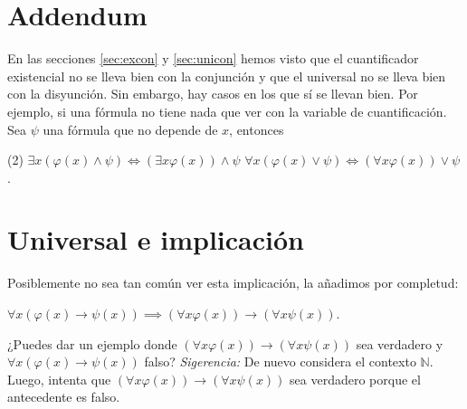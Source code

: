 \documentclass[letterpaper,DIV=12,headsepline,12pt]{scrartcl}
\begin{document}
\section{Addendum}
En las secciones \ref{sec:excon} y \ref{sec:unicon} hemos visto que el
cuantificador existencial no se lleva bien con la conjunción y que el universal
no se lleva bien con la disyunción. Sin embargo, hay casos en los que sí se
llevan bien. Por ejemplo, si una fórmula no tiene nada que ver con la variable
de cuantificación. Sea \(\psi\) una fórmula que no depende de \(x\), entonces
\begin{tasks}(2)
  \task \(\exists x(\varphi(x)\land\psi)\iff(\exists x\varphi(x))\land\psi\)
  \task \(\forall x(\varphi(x)\lor\psi)\iff(\forall x\varphi(x))\lor\psi\).
\end{tasks}

\section{Universal e implicación}
Posiblemente no sea tan común ver esta implicación, la añadimos por completud:
\begin{tasks}
  \task \(\forall x(\varphi(x)\to\psi(x))\implies(\forall x\varphi(x))\to(\forall x\psi(x))\).
\end{tasks}
¿Puedes dar un ejemplo donde \((\forall x\varphi(x))\to(\forall x\psi(x))\) sea
verdadero y \(\forall x(\varphi(x)\to\psi(x))\) falso?
\textit{Sigerencia:} De nuevo considera el contexto \(\mathbb{N}\). Luego,
intenta que \((\forall x\varphi(x))\to(\forall x\psi(x))\) sea verdadero porque
el antecedente es falso.
\end{document}
